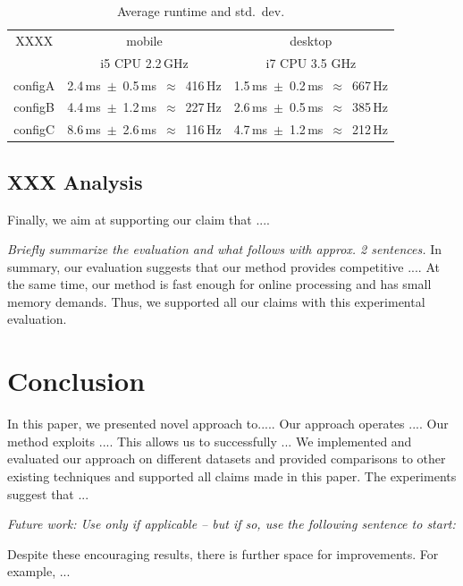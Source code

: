 \documentclass[letterpaper, 10 pt, conference]{ieeeconf}  %
\begin{document}
\begin{table}
\caption{Average runtime and std.~dev.}
\centering
{\footnotesize
\begin{tabular}{|c|c|c|}
\hline
XXXX & mobile & desktop \\
 & i5 CPU 2.2\,GHz & i7 CPU 3.5 GHz\\
\hline
configA & 2.4\,ms~$\pm$~0.5\,ms~$\approx$~416\,Hz & 1.5\,ms~$\pm$~0.2\,ms~$\approx$~667\,Hz \\
configB & 4.4\,ms~$\pm$~1.2\,ms~$\approx$~227\,Hz & 2.6\,ms~$\pm$~0.5\,ms~$\approx$~385\,Hz \\
configC & 8.6\,ms~$\pm$~2.6\,ms~$\approx$~116\,Hz & 4.7\,ms~$\pm$~1.2\,ms~$\approx$~212\,Hz \\
\hline
\end{tabular}
}
\label{tab:speed}
\end{table}

\subsection{XXX Analysis}

Finally, we aim at supporting our claim that ....

\emph{Briefly summarize the evaluation and what follows with approx. 2
  sentences.}  In summary, our evaluation suggests that our method
provides competitive .... At the same time, our method is fast enough
for online processing and has small memory demands. Thus, we supported
all our claims with this experimental evaluation.


\section{Conclusion}
\label{sec:conclusion}

In this paper, we presented novel approach to.....  
Our approach operates ....  Our method exploits ....  
This allows us to successfully ...  
We implemented and evaluated our approach on different datasets
and provided comparisons to other existing techniques and supported
all claims made in this paper. The experiments suggest that ...


\emph{Future work: Use only if applicable -- but if so, use the
  following sentence to start:} 

Despite these encouraging results, there is further space for
improvements. For example, ...





\end{document}
